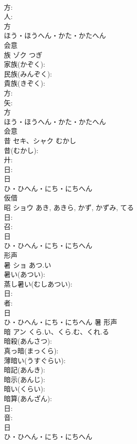 \documentclass[8pt]{extreport}
\begin{document}
\begin{CJK}{UTF8}{min}
\\	方: 
\\	人: 
\\	方	
\\	ほう・ほうへん・かた・かたへん	
\\	会意 
\\	族	ゾク		つぎ	
\\	家族(かぞく): 
\\	民族(みんぞく): 
\\	貴族(きぞく): 
\\	方: 
\\	矢: 
\\	方	
\\	ほう・ほうへん・かた・かたへん	
\\	会意 
\\	昔	セキ、シャク	むかし		
\\	昔(むかし): 
\\	廾: 
\\	日: 
\\	日	
\\	ひ・ひへん・にち・にちへん	
\\	仮借 
\\	昭	ショウ		あき, あきら, かず, かずみ, てる	
\\	日: 
\\	召: 
\\	日	
\\	ひ・ひへん・にち・にちへん	
\\	形声 
\\	暑	ショ	あつ.い		
\\	暑い(あつい): 
\\	蒸し暑い(むしあつい): 
\\	日: 
\\	者: 
\\	日	
\\	ひ・ひへん・にち・にちへん	暑	形声 
\\	暗	アン	くら.い、くら.む、くれ.る		
\\	暗殺(あんさつ): 
\\	真っ暗(まっくら): 
\\	薄暗い(うすぐらい): 
\\	暗記(あんき): 
\\	暗示(あんじ): 
\\	暗い(くらい): 
\\	暗算(あんざん): 
\\	日: 
\\	音: 
\\	日	
\\	ひ・ひへん・にち・にちへん	

\end{CJK}
\end{document}
